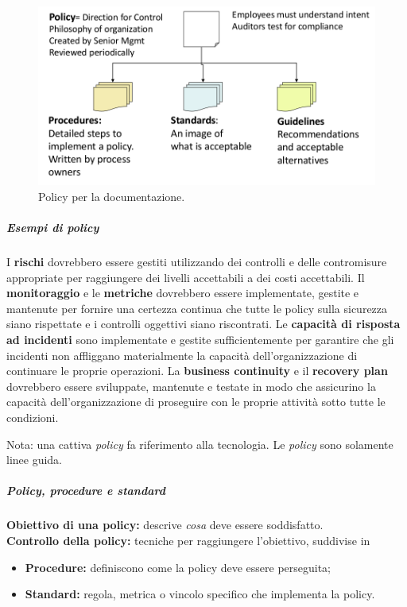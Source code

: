 \begin{figure}[h!]
        \begin{center}
                \includegraphics[scale=0.5]{res/img/documentation_policy}
        \end{center}
        \caption{Policy per la documentazione.}
\end{figure}

\subparagraph*{Esempi di policy}

I \textbf{rischi} dovrebbero essere gestiti utilizzando dei controlli e delle 
contromisure appropriate per raggiungere dei livelli accettabili a dei costi 
accettabili. Il \textbf{monitoraggio} e le \textbf{metriche} dovrebbero essere 
implementate, gestite e mantenute per fornire una certezza continua che tutte 
le policy sulla sicurezza siano rispettate e i controlli oggettivi siano 
riscontrati. Le \textbf{capacità di risposta ad incidenti} sono implementate e 
gestite sufficientemente per garantire che gli incidenti non affliggano materialmente 
la capacità dell'organizzazione di continuare le proprie operazioni. 
La \textbf{business continuity} e il \textbf{recovery plan} dovrebbero essere 
sviluppate, mantenute e testate in modo che assicurino la capacità dell'organizzazione 
di proseguire con le proprie attività sotto tutte le condizioni.

Nota: una cattiva \textit{policy} fa riferimento alla tecnologia. Le 
\textit{policy} sono solamente linee guida.

\subparagraph*{Policy, procedure e standard}

\textbf{Obiettivo di una policy:} descrive \textit{cosa} deve essere soddisfatto.\\
\newline
\textbf{Controllo della policy:} tecniche per raggiungere l'obiettivo, suddivise in
\begin{itemize}
\item \textbf{Procedure:} definiscono come la policy deve essere perseguita;
\item \textbf{Standard:} regola, metrica o vincolo specifico che implementa la policy.
\end{itemize}

